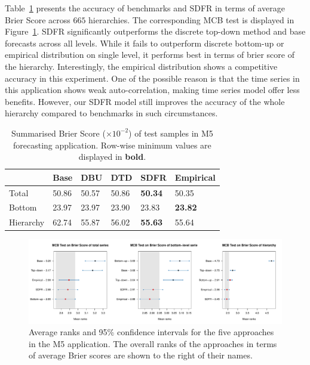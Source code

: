 \documentclass[a4paper,review,12pt,authoryear]{elsarticle}
\theoremstyle{definition}
\begin{document}
    Table~\ref{tab:M5} presents the accuracy of benchmarks and SDFR in terms of average Brier Score across $665$ hierarchies. The corresponding MCB test is displayed in Figure~\ref{fig:application_M5}. SDFR significantly outperforms the discrete top-down method and base forecasts across all levels. While it fails to outperform discrete bottom-up or empirical distribution on single level, it performs best in terms of brier score of the hierarchy. 
    Interestingly, the empirical distribution shows a competitive accuracy in this experiment. 
    One of the possible reason is that the time series in this application shows weak auto-correlation, making time series model offer less benefits.
    However, our SDFR model still improves the accuracy of the whole hierarchy compared to benchmarks in such circumstances.

    \begin{table}
        \centering
        \begin{tabular}{llllll}\toprule
            ~ & Base & DBU & DTD & SDFR & Empirical \\ \midrule
            Total & 50.86 & 50.57 & 50.86 & \textbf{50.34} & 50.35 \\ 
            Bottom & 23.97 & 23.97 & 23.90 & 23.83 & \textbf{23.82} \\ 
            Hierarchy & 62.74 & 55.87 & 56.02 & \textbf{55.63} & 55.64 \\ \bottomrule
        \end{tabular}
        \caption{\label{tab:M5}Summarised Brier Score ($\times 10^{-2}$) of test samples in M5 forecasting application. Row-wise minimum values are displayed in \textbf{bold}.}
    \end{table}


    \begin{figure}[h]
      \caption{\label{fig:application_M5}Average ranks and 95\% confidence intervals for the five approaches in the M5 application. The overall ranks of the approaches in terms of average Brier scores are shown to the right of their names.}
      \centering
      \includegraphics[width=\textwidth]{figures/M5_mcb.pdf}
    \end{figure}
\end{document}
